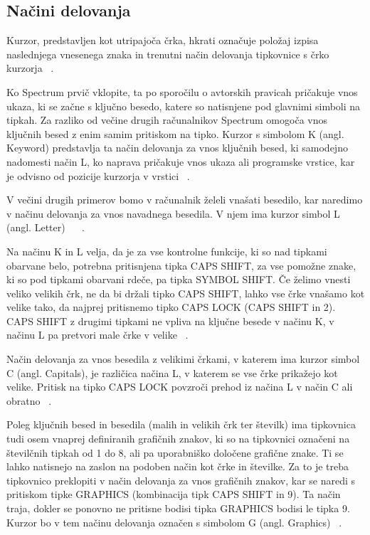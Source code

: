 \documentclass[a4paper, 12pt, openright]{book}
\begin{document}
    \subsection{Načini delovanja}

    Kurzor, predstavljen kot utripajoča črka, hkrati označuje položaj izpisa naslednjega
    vnesenega znaka in trenutni način delovanja tipkovnice s črko kurzorja ~\cite{zxspectrumbasicprogramming,
    zxspectrumintroduction}.

    Ko Spectrum prvič vklopite, ta po sporočilu o avtorskih pravicah pričakuje vnos
    ukaza, ki se začne s ključno besedo, katere so natisnjene pod glavnimi simboli
    na tipkah. Za razliko od večine drugih računalnikov Spectrum omogoča vnos
    ključnih besed z enim samim pritiskom na tipko. Kurzor s simbolom K (angl. Keyword)
    predstavlja ta način delovanja za vnos ključnih besed, ki samodejno nadomesti
    način L, ko naprava pričakuje vnos ukaza ali programske vrstice, kar je odvisno
    od pozicije kurzorja v vrstici ~\cite{zxspectrumbasicprogramming, zxspectrumintroduction}.

    V večini drugih primerov bomo v računalnik želeli vnašati besedilo, kar naredimo
    v načinu delovanja za vnos navadnega besedila. V njem ima kurzor simbol L (angl.
    Letter) ~\cite{zxspectrumintroduction} ~\cite{zxspectrumbasicprogramming}.

    Na načinu K in L velja, da je za vse kontrolne funkcije, ki so nad tipkami obarvane
    belo, potrebna pritisnjena tipka CAPS SHIFT, za vse pomožne znake, ki so pod
    tipkami obarvani rdeče, pa tipka SYMBOL SHIFT. Če želimo vnesti veliko
    velikih črk, ne da bi držali tipko CAPS SHIFT, lahko vse črke vnašamo kot
    velike tako, da najprej pritisnemo tipko CAPS LOCK (CAPS SHIFT in 2). CAPS
    SHIFT z drugimi tipkami ne vpliva na ključne besede v načinu K, v načinu L pa
    pretvori male črke v velike ~\cite{zxspectrumbasicprogramming, zxspectrumintroduction}.

    Način delovanja za vnos besedila z velikimi črkami, v katerem ima kurzor simbol
    C (angl. Capitals), je različica načina L, v katerem se vse črke prikažejo
    kot velike. Pritisk na tipko CAPS LOCK povzroči prehod iz načina L v način C ali
    obratno ~\cite{zxspectrumbasicprogramming, zxspectrumintroduction}.

    Poleg ključnih besed in besedila (malih in velikih črk ter številk) ima
    tipkovnica tudi osem vnaprej definiranih grafičnih znakov, ki so na tipkovnici
    označeni na številčnih tipkah od 1 do 8, ali pa uporabniško določene
    grafične znake. Ti se lahko natisnejo na zaslon na podoben način kot črke in številke.
    Za to je treba tipkovnico preklopiti v način delovanja za vnos grafičnih
    znakov, kar se naredi s pritiskom tipke GRAPHICS (kombinacija tipk CAPS
    SHIFT in 9). Ta način traja, dokler se ponovno ne pritisne bodisi tipka GRAPHICS
    bodisi le tipka 9. Kurzor bo v tem načinu delovanja označen s simbolom G (angl.
    Graphics) ~\cite{zxspectrumbasicprogramming, zxspectrumintroduction}.
\end{document}
